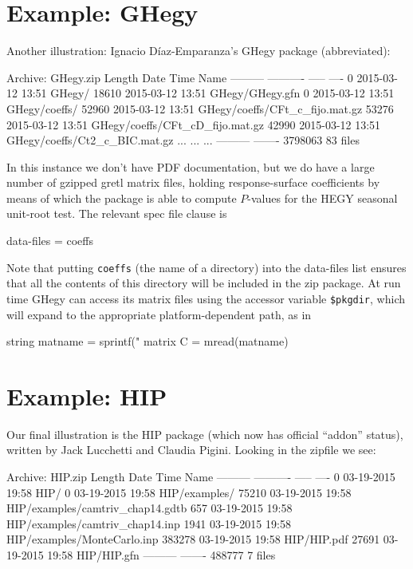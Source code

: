 \documentclass[oneside]{book}
\begin{document}
\section{Example: \textsf{GHegy}}

Another illustration: Ignacio D\'iaz-Emparanza's \textsf{GHegy}
package (abbreviated):
%
\begin{code}
Archive:  GHegy.zip
  Length      Date    Time    Name
---------  ---------- -----   ----
        0  2015-03-12 13:51   GHegy/
    18610  2015-03-12 13:51   GHegy/GHegy.gfn
        0  2015-03-12 13:51   GHegy/coeffs/
    52960  2015-03-12 13:51   GHegy/coeffs/CFt_c_fijo.mat.gz
    53276  2015-03-12 13:51   GHegy/coeffs/CFt_cD_fijo.mat.gz
    42990  2015-03-12 13:51   GHegy/coeffs/Ct2_c_BIC.mat.gz
    ...    ...                ...
---------                     -------
  3798063                     83 files
\end{code}

In this instance we don't have PDF documentation, but we do have a
large number of gzipped gretl matrix files, holding response-surface
coefficients by means of which the package is able to compute
$P$-values for the HEGY seasonal unit-root test. The relevant
spec file clause is
%
\begin{code}
data-files = coeffs
\end{code}
%
Note that putting \texttt{coeffs} (the name of a directory) into the
data-files list ensures that all the contents of this directory will
be included in the zip package. At run time \textsf{GHegy} can access
its matrix files using the accessor variable
\verb|$pkgdir|, which will expand to the appropriate
platform-dependent path, as in
%
\begin{code}
string matname = sprintf("%
matrix C = mread(matname)
\end{code}

\section{Example: \textsf{HIP}}
\label{sec:HIP}

Our final illustration is the \textsf{HIP} package (which now has
official ``addon'' status), written by Jack Lucchetti and Claudia
Pigini. Looking in the zipfile we see:
%
\begin{code}
Archive:  HIP.zip
  Length      Date    Time    Name
---------  ---------- -----   ----
        0  03-19-2015 19:58   HIP/
        0  03-19-2015 19:58   HIP/examples/
    75210  03-19-2015 19:58   HIP/examples/camtriv_chap14.gdtb
      657  03-19-2015 19:58   HIP/examples/camtriv_chap14.inp
     1941  03-19-2015 19:58   HIP/examples/MonteCarlo.inp
   383278  03-19-2015 19:58   HIP/HIP.pdf
    27691  03-19-2015 19:58   HIP/HIP.gfn
---------                     -------
   488777                     7 files
\end{code}
\end{document}
